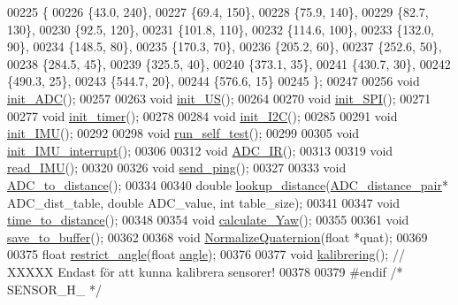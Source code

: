 \begin{DoxyCode}
00225 \{
00226     \{43.0, 240\},
00227     \{69.4, 150\},
00228     \{75.9, 140\},
00229     \{82.7, 130\},
00230     \{92.5, 120\},
00231     \{101.8, 110\},
00232     \{114.6, 100\},
00233     \{132.0, 90\},
00234     \{148.5, 80\},
00235     \{170.3, 70\},
00236     \{205.2, 60\},
00237     \{252.6, 50\},
00238     \{284.5, 45\},
00239     \{325.5, 40\},
00240     \{373.1, 35\},
00241     \{430.7, 30\},
00242     \{490.3, 25\},
00243     \{544.7, 20\},
00244     \{576.6, 15\}
00245 \};  
00247 
00256 \textcolor{keywordtype}{void} \hyperlink{sensor_8h_a342ab07b607f3dc4efa0655ca1acd164}{init\_ADC}();
00257 
00263 \textcolor{keywordtype}{void} \hyperlink{sensor_8h_a16afe9a4d2627f3f7f1bab054d4ad7ad}{init\_US}();
00264 
00270 \textcolor{keywordtype}{void} \hyperlink{sensor_8h_a1065be4c03eff55f82e136ccb95a2854}{init\_SPI}();
00271 
00277 \textcolor{keywordtype}{void} \hyperlink{sensor_8h_a38016ab7b2931bcb950e0c6f3ba3f342}{init\_timer}();
00278 
00284 \textcolor{keywordtype}{void} \hyperlink{sensor_8h_a87c8819d26491fb701918e147117710c}{init\_I2C}();
00285 
00291 \textcolor{keywordtype}{void} \hyperlink{sensor_8h_a1009b8de0745458d734bd73beda5ea25}{init\_IMU}();
00292 
00298 \textcolor{keywordtype}{void} \hyperlink{sensor_8h_abf51091638bfe4a1e4479fa12a95b0a9}{run\_self\_test}();
00299 
00305 \textcolor{keywordtype}{void} \hyperlink{sensor_8h_ad53a97524cf65efb444e93e9061d9353}{init\_IMU\_interrupt}();
00306 
00312 \textcolor{keywordtype}{void} \hyperlink{sensor_8h_a41da5db2af35bde04662acc0c8ed5e22}{ADC\_IR}();
00313 
00319 \textcolor{keywordtype}{void} \hyperlink{sensor_8h_ad5232fda58bb026c495517be3c84307a}{read\_IMU}();
00320 
00326 \textcolor{keywordtype}{void} \hyperlink{sensor_8h_ae0b3db1a7cd93a0205ff39ef05844259}{send\_ping}();
00327 
00333 \textcolor{keywordtype}{void} \hyperlink{sensor_8h_ad15899f7d08c246d74789f75dd145035}{ADC\_to\_distance}();
00334 
00340 \textcolor{keywordtype}{double} \hyperlink{sensor_8h_a074b774196f608f2234e624682b55967}{lookup\_distance}(\hyperlink{struct_a_d_c__distance__pair}{ADC\_distance\_pair}* ADC\_dist\_table, \textcolor{keywordtype}{double} ADC\_value,
       \textcolor{keywordtype}{int} table\_size);
00341 
00347 \textcolor{keywordtype}{void} \hyperlink{sensor_8h_a4400365e5a5de20eeaf4e78531e39e9b}{time\_to\_distance}();
00348 
00354 \textcolor{keywordtype}{void} \hyperlink{sensor_8h_a5611f3fef1c7ebe6f76d952adf576e86}{calculate\_Yaw}();
00355 
00361 \textcolor{keywordtype}{void} \hyperlink{sensor_8h_a387deb5b003e6eec445d95d9b30717f4}{save\_to\_buffer}();
00362 
00368 \textcolor{keywordtype}{void} \hyperlink{sensor_8h_ad838d8be45b7b7018e394ec9319e3795}{NormalizeQuaternion}(\textcolor{keywordtype}{float} *quat);
00369 
00375 \textcolor{keywordtype}{float} \hyperlink{sensor_8h_abf62ec6a8b0cc932582548dbd5032901}{restrict\_angle}(\textcolor{keywordtype}{float} \hyperlink{styr_2styr_2main_8c_ab8ef1bf8a70cc07c6d55823c390a7e76}{angle});
00376 
00377 \textcolor{keywordtype}{void} \hyperlink{sensor_8h_ac6723e64e3c0cb29dcf2a13409964453}{kalibrering}();      \textcolor{comment}{// XXXXX Endast för att kunna kalibrera sensorer!}
00378 
00379 \textcolor{preprocessor}{#endif }\textcolor{comment}{/* SENSOR\_H\_ */}\textcolor{preprocessor}{}
\end{DoxyCode}
